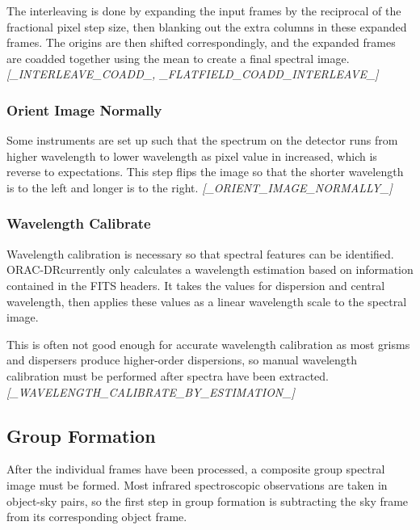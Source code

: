 \documentclass[twoside,11pt,nolof]{starlink}
\providecommand{\ORACDR}{{\footnotesize ORAC-DR}}
\begin{document}
The interleaving is done by expanding the input frames by the
reciprocal of the fractional pixel step size, then blanking out
the extra columns in these expanded frames. The origins are then
shifted correspondingly, and the expanded frames are coadded
together using the mean to create a final spectral image.
\newline \emph{[\_INTERLEAVE\_COADD\_, \_FLATFIELD\_COADD\_INTERLEAVE\_]}

\subsubsection{Orient Image Normally\label{orient_image}}

Some instruments are set up such that the spectrum on the detector
runs from higher wavelength to lower wavelength as pixel value in
increased, which is reverse to expectations. This step flips
the image so that the shorter wavelength is to the left and longer
is to the right.
\newline \emph{[\_ORIENT\_IMAGE\_NORMALLY\_]}

\subsubsection{Wavelength Calibrate\label{wavelength_calibrate}}

Wavelength calibration is necessary so that spectral features can
be identified. \ORACDR currently only calculates a wavelength
estimation based on information contained in the FITS headers.
It takes the values for dispersion and central wavelength, then
applies these values as a linear wavelength scale to the spectral
image.

This is often not good enough for accurate wavelength calibration
as most grisms and dispersers produce higher-order dispersions, so
manual wavelength calibration must be performed after spectra have
been extracted.
\newline \emph{[\_WAVELENGTH\_CALIBRATE\_BY\_ESTIMATION\_]}

\subsection{Group Formation\label{group_formation}}

After the individual frames have been processed, a composite group
spectral image must be formed. Most infrared spectroscopic observations
are taken in object-sky pairs, so the first step in group formation
is subtracting the sky frame from its corresponding object frame.
\end{document}
